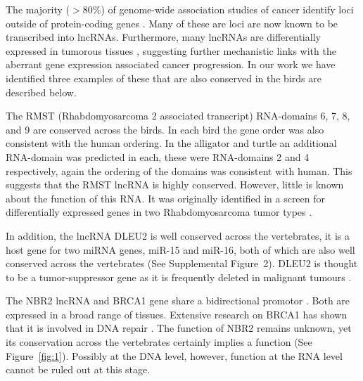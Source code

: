 \documentclass[10pt]{bmc_article}
\newenvironment{bmcformat}{\begin{raggedright}\baselineskip20pt\sloppy\setboolean{publ}{false}}{\end{raggedright}\baselineskip20pt\sloppy}
\begin{document}
\begin{bmcformat}

The majority ($>80\%$) of genome-wide association studies of cancer
identify loci outside of protein-coding genes
\cite{Cheetham:2013}. Many of these are loci are now known to be
transcribed into lncRNAs. Furthermore, many lncRNAs are differentially
expressed in tumorous tissues \cite{Chan:2002}, suggesting further
mechanistic links with the aberrant gene expression associated cancer
progression. In our work we have identified three examples of these
that are also conserved in the birds are described below.

The RMST (Rhabdomyosarcoma 2 associated transcript) RNA-domains 6, 7,
8, and 9 are conserved across the birds. In each bird the gene order
was also consistent with the human ordering. In the alligator and
turtle an additional RNA-domain was predicted in each, these were
RNA-domains 2 and 4 respectively, again the ordering of the domains
was consistent with human. This suggests that the RMST lncRNA is
highly conserved. However, little is known about the function of this
RNA. It was originally identified in a screen for differentially
expressed genes in two Rhabdomyosarcoma tumor types \cite{Chan:2002}.

In addition, the lncRNA DLEU2 is well conserved across the
vertebrates, it is a host gene for two miRNA genes, miR-15 and miR-16,
both of which are also well conserved across the vertebrates (See
Supplemental Figure~2). DLEU2 is thought to be a tumor-suppressor gene
as it is frequently deleted in malignant tumours
\cite{Lerner:2009,Klein:2010}.

The NBR2 lncRNA and BRCA1 gene share a bidirectional promotor
\cite{Xu:1997}. Both are expressed in a broad range of
tissues. Extensive research on BRCA1 has shown that it is involved in
DNA repair \cite{Moynahan:1999}. The function of NBR2 remains unknown,
yet its conservation across the vertebrates certainly implies a
function (See Figure~\ref{fig:1}). Possibly at the DNA level, however,
function at the RNA level cannot be ruled out at this stage.


\end{bmcformat}
\end{document}
